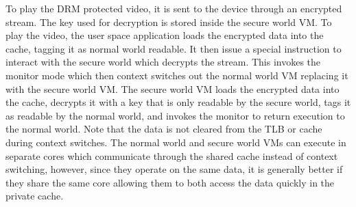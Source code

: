     To play the DRM protected video, it is sent to the device through an 
    encrypted stream. The key used for decryption is stored inside the secure 
    world VM. To play the video, the user space application loads the encrypted 
    data into the cache, tagging it as normal world readable. It then issue a 
    special instruction to interact with the secure world which decrypts the 
    stream. This invokes the monitor mode which then context switches out the 
    normal world VM replacing it with the secure world VM. The secure world VM 
    loads the encrypted data into the cache, decrypts it with a key that is 
    only readable by the secure world, tags it as readable by the normal world, 
    and invokes the monitor to return execution to the normal world. Note that 
    the data is not cleared from the TLB or cache during context switches.  The 
    normal world and secure world VMs can execute in separate cores which 
    communicate through the shared cache instead of context switching, however, 
    since they operate on the same data, it is generally better if they share 
    the same core allowing them to both access the data quickly in the private 
    cache.
